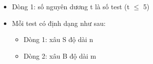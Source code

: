 \begin{itemize}
	\item     Dòng 1: số nguyên dương t là số test (t  $\le$  5)   
	\item     Mỗi test có định dạng như sau:    
\begin{itemize}
	\item       Dòng 1: xâu S độ dài n     
	\item       Dòng 2: xâu B độ dài m     
\end{itemize}
\end{itemize}